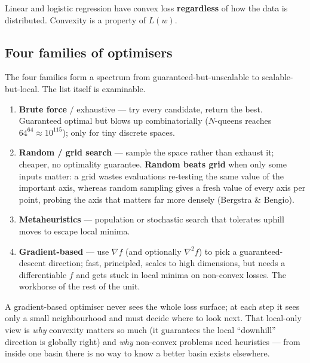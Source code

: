 \documentclass[11pt, a4paper]{article}
\newcommand{\kw}[1]{\textbf{#1}}
\begin{document}
\begin{pitfallbox}
Linear and logistic regression have convex loss \kw{regardless} of how the data is distributed.
Convexity is a property of $L(w)$.
\end{pitfallbox}

\subsection{Four families of optimisers}

The four families form a spectrum from guaranteed-but-unscalable to scalable-but-local. The list
itself is examinable.

\begin{enumerate}
  \item \kw{Brute force} / exhaustive — try every candidate, return the best. Guaranteed optimal but
  blows up combinatorially ($N$-queens reaches $64^{64}\!\approx\!10^{115}$); only for tiny discrete
  spaces.
  \item \kw{Random / grid search} — sample the space rather than exhaust it; cheaper, no optimality
  guarantee. \kw{Random beats grid} when only some inputs matter: a grid wastes evaluations re-testing
  the same value of the important axis, whereas random sampling gives a fresh value of every axis per
  point, probing the axis that matters far more densely (Bergstra \& Bengio).
  \item \kw{Metaheuristics} — population or stochastic search that tolerates uphill moves to escape
  local minima.
  \item \kw{Gradient-based} — use $\nabla f$ (and optionally $\nabla^2 f$) to pick a guaranteed-descent
  direction; fast, principled, scales to high dimensions, but needs a differentiable $f$ and gets
  stuck in local minima on non-convex losses. The workhorse of the rest of the unit.
\end{enumerate}

\begin{notebox}
A gradient-based optimiser never sees the whole loss surface; at each step it sees only a small
neighbourhood and must decide where to look next. That local-only view is \emph{why} convexity
matters so much (it guarantees the local ``downhill'' direction is globally right) and \emph{why}
non-convex problems need heuristics — from inside one basin there is no way to know a better basin
exists elsewhere.
\end{notebox}
\end{document}
